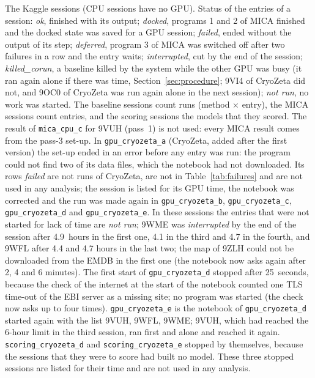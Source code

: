 \begin{table}[tbp]
\centering\small
\caption{The \NSessions{} Kaggle sessions (CPU sessions have no GPU). Status of the entries of a session: \emph{ok}, finished with its output; \emph{docked}, programs 1 and 2 of MICA finished and the docked state was saved for a GPU session; \emph{failed}, ended without the output of its step; \emph{deferred}, program 3 of MICA was switched off after two failures in a row and the entry waits; \emph{interrupted}, cut by the end of the session; \emph{killed\_corun}, a baseline killed by the system while the other GPU was busy (it ran again alone if there was time, Section~\ref{sec:procedure}; 9VI4 of CryoZeta did not, and 9OC0 of CryoZeta was run again alone in the next session); \emph{not run}, no work was started. The baseline sessions count runs (method $\times$ entry), the MICA sessions count entries, and the scoring sessions the models that they scored. The result of \texttt{mica\_cpu\_c} for 9VUH (pass~1) is not used: every MICA result comes from the pass-3 set-up. In \texttt{gpu\_cryozeta\_a} (CryoZeta, added after the first version) the set-up ended in an error before any entry was run: the program could not find two of its data files, which the notebook had not downloaded. Its rows \emph{failed} are not runs of CryoZeta, are not in Table~\ref{tab:failures} and are not used in any analysis; the session is listed for its GPU time, the notebook was corrected and the run was made again in \texttt{gpu\_cryozeta\_b}, \texttt{gpu\_cryozeta\_c}, \texttt{gpu\_cryozeta\_d} and \texttt{gpu\_cryozeta\_e}. In these sessions the entries that were not started for lack of time are \emph{not run}; 9WME was \emph{interrupted} by the end of the session after 4.9~hours in the first one, 4.1 in the third and 4.7 in the fourth, and 9WFL after 4.4 and 4.7 hours in the last two; the map of 9ZLH could not be downloaded from the EMDB in the first one (the notebook now asks again after 2, 4 and 6 minutes). The first start of \texttt{gpu\_cryozeta\_d} stopped after 25~seconds, because the check of the internet at the start of the notebook counted one TLS time-out of the EBI server as a missing site; no program was started (the check now asks up to four times). \texttt{gpu\_cryozeta\_e} is the notebook of \texttt{gpu\_cryozeta\_d} started again with the list 9VUH, 9WFL, 9WME; 9VUH, which had reached the 6-hour limit in the third session, ran first and alone and reached it again. \texttt{scoring\_cryozeta\_d} and \texttt{scoring\_cryozeta\_e} stopped by themselves, because the sessions that they were to score had built no model. These three stopped sessions are listed for their time and are not used in any analysis.}
\label{tab:sessions}
\fitwidth{}
\end{table}


